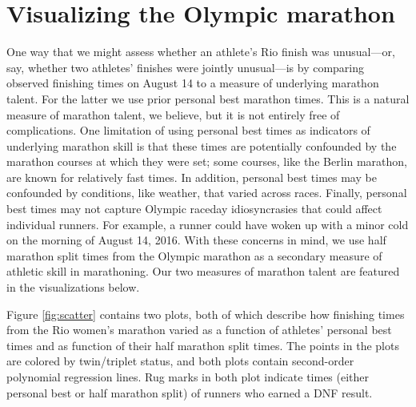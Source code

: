 \documentclass[12pt,titlepage]{article}
\begin{document}
\section*{Visualizing the Olympic marathon}

One way that we might assess whether an athlete's Rio finish was
unusual---or, say, whether two athletes' finishes were jointly
unusual---is by comparing observed finishing times on August 14 to a
measure of underlying marathon talent.  For the latter we use prior
personal best marathon times.  This is a natural measure of marathon
talent, we believe, but it is not entirely free of complications.  One
limitation of using personal best times as indicators of underlying
marathon skill is that these times are potentially confounded by the
marathon courses at which they were set; some courses, like the Berlin
marathon, are known for relatively fast times.  In addition, personal
best times may be confounded by conditions, like weather, that varied
across races.  Finally, personal best times may not capture Olympic
raceday idiosyncrasies that could affect individual runners.  For
example, a runner could have woken up with a minor cold on the morning
of August 14, 2016.  With these concerns in mind, we use half marathon
split times from the Olympic marathon as a secondary measure of
athletic skill in marathoning.  Our two measures of marathon talent
are featured in the visualizations below.

Figure \ref{fig:scatter} contains two plots, both of which describe
how finishing times from the Rio women's marathon varied as a function
of athletes' personal best times and as function of their half
marathon split times.  The points in the plots are colored by
twin/triplet status, and both plots contain second-order polynomial
regression lines.  Rug marks in both plot indicate times (either
personal best or half marathon split) of runners who earned a DNF
result.
\end{document}
